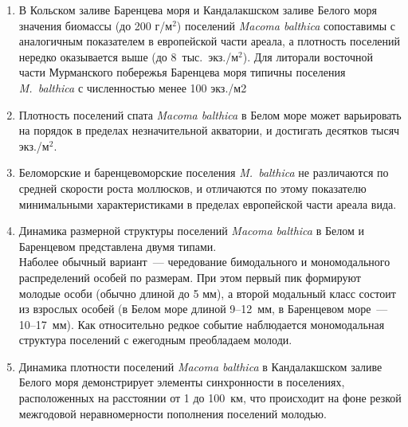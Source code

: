 	\begin{enumerate}
		\item В Кольском заливе Баренцева моря и Кандалакшском заливе  Белого моря значения биомассы (до 200 г/м$^2$) поселений {\it Macoma balthica} сопоставимы с аналогичным показателем в европейской части ареала, а плотность поселений нередко оказывается выше (до 8~тыс.~экз./м$^2$). Для литорали восточной части Мурманского побережья Баренцева моря типичны поселения {\it M.~balthica} с численностью менее 100 экз./м2 
		\item Плотность поселений спата {\it Macoma balthica} в Белом море может варьировать на порядок в пределах незначительной акватории, и достигать десятков тысяч экз./м$^2$.
		\item Беломорские и баренцевоморские поселения {\it M.~balthica} не различаются по средней скорости роста моллюсков, и отличаются по этому показателю минимальными характеристиками в пределах европейской части ареала вида. 
		\item Динамика размерной структуры поселений {\it Macoma balthica} в Белом и Баренцевом представлена двумя типами. \\
Наболее обычный вариант~--- чередование бимодального и мономодального распределений особей по размерам. При этом первый пик формируют молодые
особи (обычно длиной до 5 мм), а второй модальный класс состоит из взрослых особей (в Белом море длиной 9--12~мм, в Баренцевом море~--- 10--17~мм).
Как относительно редкое событие наблюдается мономодальная структура поселений с ежегодным преобладаем молоди.
		\item Динамика плотности поселений {\it Macoma balthica} в Кандалакшском заливе Белого моря демонстрирует элементы синхронности в поселениях, расположенных на расстоянии от 1 до 100~км, что происходит на фоне резкой межгодовой неравномерности пополнения поселений молодью.  


\end{enumerate}

